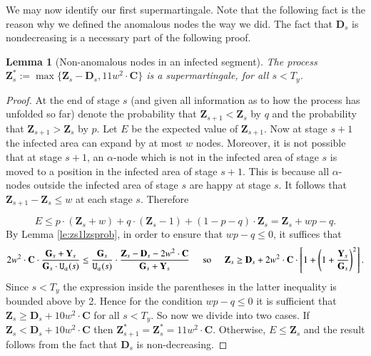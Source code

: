 \documentclass[11pt]{article}
\theoremstyle{plain}
\newtheorem{lem}[thm]{Lemma}
\numberwithin{equation}{subsection}
\newcommand{\ZZ}{\mathbf{Z}}
\newcommand{\DD}{\mathbf{D}}
\newcommand{\GG}{\mathbf{G}}
\newcommand{\YY}{\mathbf{Y}}
\newcommand{\CC}{\mathbf{C}}
\newcommand{\unhap}{\mathtt{U}}
\begin{document}
We may now identify our first supermartingale. Note that the following fact is the reason why we defined
the anomalous nodes the way we did. The fact that $\DD_s$ is nondecreasing is a necessary part of the
following proof. 

\begin{lem}[Non-anomalous nodes in an infected segment]\label{le:zhsisma}\label{le:zhssecgisma}
The process $\ZZ^{\ast}_s:=\max\{\ZZ_s-\DD_s, 11w^2\cdot\CC\}$ is a supermartingale, 
for all $s<T_y$.
\end{lem}
\begin{proof}  At the end of stage $s$ (and given all information as to how the process has unfolded so far)
denote the probability that 
$\ZZ_{s+1}<\ZZ_s$ by $q$ and the probability that $\ZZ_{s+1}>\ZZ_s$
by $p$.  Let $E$ be the expected value of $\ZZ_{s+1}$. Now at  stage $s+1$ the infected area can expand by at most $w$ nodes.
Moreover, it is not possible that at stage $s+1$,
an $\alpha$-node which is not in the infected area of stage $s$  
is moved to a position in the infected area of stage $s+1$.
This is because all $\alpha$-nodes outside  
the infected area of stage $s$
are happy at stage $s$.
It follows that $\ZZ_{s+1}-\ZZ_s\leq w$ at each stage $s$. Therefore

\begin{equation}\label{eq:expecpqzsfs}
E\leq p\cdot (\ZZ_s+w) +
q\cdot (\ZZ_s-1) + (1-p-q)\cdot \ZZ_s = \ZZ_s + wp-q.
\end{equation}
By Lemma
\ref{le:zs1lzsprob}, in order to ensure that  $wp-q\leq 0$, it suffices that
\[
2w^2\cdot\CC\cdot\frac{\GG_s+\YY_s}{\GG_s\cdot \unhap_{\alpha}(s)}
\leq \frac{\GG_s}{\unhap_{\alpha}(s)}\cdot \frac{\ZZ_s-\DD_s-2w^2\cdot\CC}{\GG_s+\YY_s}
\hspace{0.5cm}
\textrm{so}
\hspace{0.5cm}
\ZZ_s\geq \DD_s + 2w^2\cdot\CC\cdot\left[1+ \left(1+\frac{\YY_s}{\GG_s}\right)^2\right]
.\]
Since $s<T_y$
the expression inside the parentheses in the latter inequality
is bounded above by 2. Hence for the condition $wp-q\leq 0$
it is sufficient that
$\ZZ_s\geq \DD_s +10w^2\cdot\CC$
for all $s<T_y$. So now we divide into two cases. If 
$\ZZ_s< \DD_s +10w^2\cdot\CC$ then $\ZZ_{s+1}^{\ast}=\ZZ_{s}^{\ast}= 11w^2\cdot \CC$. 
Otherwise, $E\leq \ZZ_s$ and the result follows from the fact that 
$\DD_s$ is non-decreasing.  \end{proof}
\end{document}
